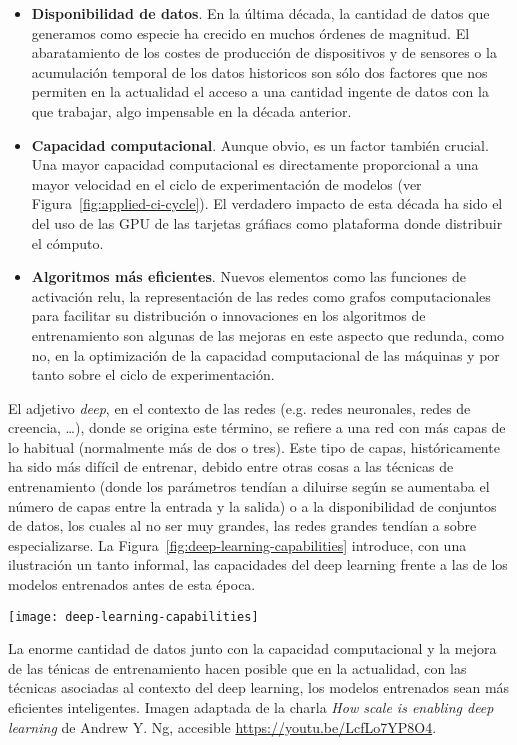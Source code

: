\begin{itemize}
	\item \textbf{Disponibilidad de datos}. En la última década, la cantidad de datos que generamos como especie ha crecido en muchos órdenes de magnitud. El abaratamiento de los costes de producción de dispositivos y de sensores o la acumulación temporal de los datos historicos son sólo dos factores que nos permiten en la actualidad el acceso a una cantidad ingente de datos con la que trabajar, algo impensable en la década anterior.
	\item \textbf{Capacidad computacional}. Aunque obvio, es un factor también crucial. Una mayor capacidad computacional es directamente proporcional a una mayor velocidad en el ciclo de experimentación de modelos (ver Figura~\ref{fig:applied-ci-cycle}). El verdadero impacto de esta década ha sido el del uso de las GPU de las tarjetas gráfiacs como plataforma donde distribuir el cómputo.
	\item \textbf{Algoritmos más eficientes}. Nuevos elementos como las funciones de activación \gls{relu}, la representación de las redes como grafos computacionales para facilitar su distribución o innovaciones en los algoritmos de entrenamiento son algunas de las mejoras en este aspecto que redunda, como no, en la optimización de la capacidad computacional de las máquinas y por tanto sobre el ciclo de experimentación.
\end{itemize}

El adjetivo \textit{deep}, en el contexto de las redes (e.g. redes neuronales, redes de creencia, \ldots), donde se origina este término, se refiere a una red con más capas de lo habitual (normalmente más de dos o tres). Este tipo de capas, históricamente ha sido más difícil de entrenar, debido entre otras cosas a las técnicas de entrenamiento (donde los parámetros tendían a diluirse según se aumentaba el número de capas entre la entrada y la salida) o a la disponibilidad de conjuntos de datos, los cuales al no ser muy grandes, las redes grandes tendían a sobre especializarse. La Figura~\ref{fig:deep-learning-capabilities} introduce, con una ilustración un tanto informal, las capacidades del deep learning frente a las de los modelos entrenados antes de esta época.

\begin{marginfigure}
	\texttt{[image: deep-learning-capabilities]}
	\caption[Capacidad de los modelos en función de la cantidad de datos]{La enorme cantidad de datos junto con la capacidad computacional y la mejora de las ténicas de entrenamiento hacen posible que en la actualidad, con las técnicas asociadas al contexto del deep learning, los modelos entrenados sean más eficientes  inteligentes. Imagen adaptada de la charla \textit{How scale is enabling deep learning} de Andrew Y. Ng, accesible \url{https://youtu.be/LcfLo7YP8O4}.}
	\label{fig:deep-learning-capabilities}
\end{marginfigure}

